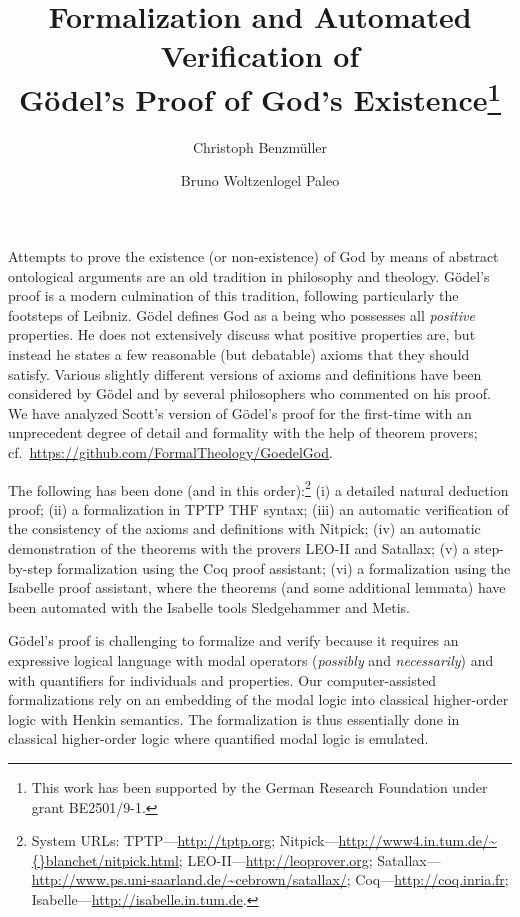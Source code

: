 \documentclass{llncs}
\title{ Formalization and Automated Verification of %
    \\ G\"{o}del's Proof of God's Existence\thanks{This work has been
    supported by the German Research Foundation under grant
    BE2501/9-1.}  }
\author{
  Christoph Benzm\"{u}ller\inst{1} 
  \and 
  Bruno Woltzenlogel Paleo\inst{2}
}
\institute{
  Dahlem Center for Intelligent Sstems, Freie Universit\"{a}t Berlin, Germany\\
  \and 
  Theory and Logic Group, Vienna University of Technology, Austria \\
}
\begin{document}
\maketitle

Attempts to prove the existence (or non-existence) of God by means of
abstract ontological arguments are an old tradition in philosophy and
theology.  G\"{o}del's proof \cite{Goedel1970,GoedelNotes} is a modern culmination of
this tradition, following particularly the footsteps of Leibniz.
%
G\"{o}del defines God as a being who possesses all \emph{positive} properties.
He does not extensively discuss what positive properties are, 
but instead he states a few reasonable (but debatable) axioms that they should satisfy.
Various slightly different versions of axioms and definitions have
been considered by G\"{o}del and by several philosophers who commented
on his proof. %
We have analyzed Scott's version of G\"{o}del's proof \cite{ScottNotes} for the first-time
with an unprecedent degree of detail 
and formality with the help of theorem provers; cf.~\url{https://github.com/FormalTheology/GoedelGod}.

The following has been done (and in this order):\footnote{System URLs:
 TPTP---\url{http://tptp.org};
 Nitpick---\url{http://www4.in.tum.de/\~{}blanchet/nitpick.html};
 LEO-II---\url{http://leoprover.org};
 Satallax---\url{http://www.ps.uni-saarland.de/~cebrown/satallax/}; 
 Coq---\url{http://coq.inria.fr};
 Isabelle---\url{http://isabelle.in.tum.de}.
}
(i) a detailed natural deduction proof;
%
(ii) a formalization in TPTP THF syntax;
%
(iii) an automatic verification of the consistency of the axioms and 
definitions with Nitpick;
%
(iv) an automatic demonstration of the theorems with the provers LEO-II and Satallax;
%
(v) a step-by-step formalization using the Coq proof assistant;
%
(vi) a formalization using the Isabelle proof assistant, where the
theorems (and some additional lemmata) have been automated with the
Isabelle tools Sledgehammer and Metis.


G\"{o}del's proof is challenging to formalize and verify because it
requires an expressive logical language with modal operators
(\emph{possibly} and \emph{necessarily}) and with
quantifiers for individuals and properties.  Our computer-assisted formalizations rely on an
embedding of the modal logic into classical higher-order logic with
Henkin semantics. The formalization is thus essentially
done in classical higher-order logic where  quantified modal logic is
emulated.
\end{document}
